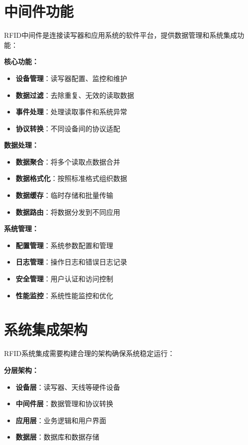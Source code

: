 \documentclass[12pt,UTF8]{ctexbook}
\begin{document}
\begin{itemize}[leftmargin=3.5em]
\begin{itemize}[leftmargin=3.5em]
\section{中间件功能}

RFID中间件是连接读写器和应用系统的软件平台，提供数据管理和系统集成功能：

\textbf{核心功能：}
\begin{itemize}[leftmargin=3.5em]
    \item \textbf{设备管理}：读写器配置、监控和维护
    \item \textbf{数据过滤}：去除重复、无效的读取数据
    \item \textbf{事件处理}：处理读取事件和系统异常
    \item \textbf{协议转换}：不同设备间的协议适配
\end{itemize}

\textbf{数据处理：}
\begin{itemize}[leftmargin=3.5em]
    \item \textbf{数据聚合}：将多个读取点数据合并
    \item \textbf{数据格式化}：按照标准格式组织数据
    \item \textbf{数据缓存}：临时存储和批量传输
    \item \textbf{数据路由}：将数据分发到不同应用
\end{itemize}

\textbf{系统管理：}
\begin{itemize}[leftmargin=3.5em]
    \item \textbf{配置管理}：系统参数配置和管理
    \item \textbf{日志管理}：操作日志和错误日志记录
    \item \textbf{安全管理}：用户认证和访问控制
    \item \textbf{性能监控}：系统性能监控和优化
\end{itemize}

\section{系统集成架构}

RFID系统集成需要构建合理的架构确保系统稳定运行：

\textbf{分层架构：}
\begin{itemize}[leftmargin=3.5em]
    \item \textbf{设备层}：读写器、天线等硬件设备
    \item \textbf{中间件层}：数据管理和协议转换
    \item \textbf{应用层}：业务逻辑和用户界面
    \item \textbf{数据层}：数据库和数据存储
\end{itemize}


\end{itemize}
\end{itemize}
\end{document}
